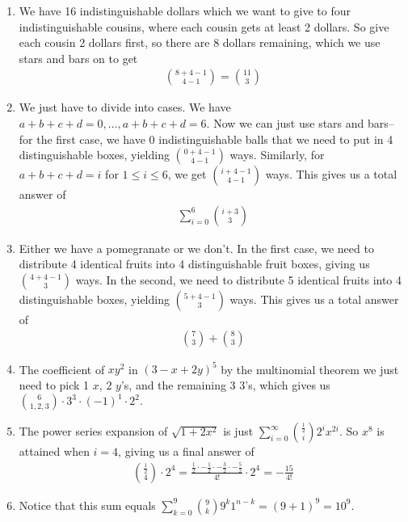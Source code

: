 \documentclass[12pt]{article}
\theoremstyle{definitionstyle}
\begin{document}
\begin{enumerate}[leftmargin=\labelsep]
		\item We have 16 indistinguishable dollars which we want to give to four indistinguishable cousins, where each cousin gets at least 2 dollars. So give each cousin 2 dollars first, so there are 8 dollars remaining, which we use stars and bars on to get
		\begin{align*}
			{8 + 4 - 1 \choose 4 - 1} = {11 \choose 3}
		\end{align*}
	
		\item We just have to divide into cases. We have $a + b + c + d  = 0, \ldots, a + b + c + d = 6$. Now we can just use stars and bars--for the first case, we have 0 indistinguishable balls that we need to put in 4 distinguishable boxes, yielding ${0 + 4 - 1 \choose 4 - 1}$ ways. Similarly, for $a + b + c + d = i$ for $1 \leq i \leq 6$, we get ${i + 4 - 1 \choose 4 - 1}$ ways. This gives us a total answer of
		\begin{align*}
			\sum_{i=0}^6 {i + 3 \choose 3}
		\end{align*}
	
		\item Either we have a pomegranate or we don't. In the first case, we need to distribute 4 identical fruits into 4 distinguishable fruit boxes, giving us ${4 + 4 - 1 \choose 3}$ ways. In the second, we need to distribute 5 identical fruits into 4 distinguishable boxes, yielding ${5 + 4 - 1 \choose 3}$ ways. This gives us a total answer of
		\begin{align*}
			{7 \choose 3} + {8 \choose 3}
		\end{align*}
	
		\item The coefficient of $xy^2$ in $(3-x+2y)^5$ by the multinomial theorem we just need to pick 1 $x$, $2$ $y$'s, and the remaining 3 3's, which gives us ${6 \choose 1, 2, 3} \cdot 3^3 \cdot (-1)^1 \cdot 2^2$.
		
		\item The power series expansion of $\sqrt{1+2x^2}$ is just $\sum_{i=0}^\infty {\frac12 \choose i} 2^i x^{2i}$. So $x^8$ is attained when $i = 4$, giving us a final answer of
		\begin{align*}
			{\frac12 \choose 4} \cdot 2^4 = \frac{\frac12 \cdot -\frac12 \cdot -\frac32 \cdot -\frac 52}{4!} \cdot 2^4 = -\frac{15}{4!}
		\end{align*}
	
		\item Notice that this sum equals $\sum_{k=0}^9 {9 \choose k} 9^k 1^{n-k} = (9+1)^9 = 10^9$.
		

\end{enumerate}
\end{document}
